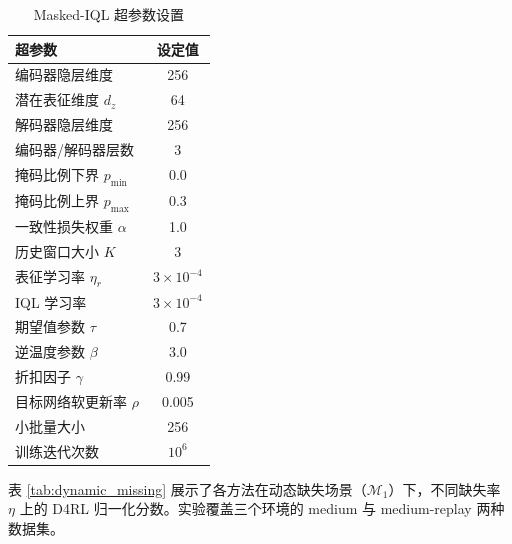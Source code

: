 \begin{table}[htbp]
    \centering
    \caption{Masked-IQL 超参数设置}
    \label{tab:masked_iql_hyperparams}
    \begin{tabular}{lc}
        \hline
        超参数 & 设定值 \\
        \hline
        编码器隐层维度 & 256 \\
        潜在表征维度 $d_z$ & 64 \\
        解码器隐层维度 & 256 \\
        编码器/解码器层数 & 3 \\
        掩码比例下界 $p_{\min}$ & 0.0 \\
        掩码比例上界 $p_{\max}$ & 0.3 \\
        一致性损失权重 $\alpha$ & 1.0 \\
        历史窗口大小 $K$ & 3 \\
        表征学习率 $\eta_r$ & $3 \times 10^{-4}$ \\
        IQL 学习率 & $3 \times 10^{-4}$ \\
        期望值参数 $\tau$ & 0.7 \\
        逆温度参数 $\beta$ & 3.0 \\
        折扣因子 $\gamma$ & 0.99 \\
        目标网络软更新率 $\rho$ & 0.005 \\
        小批量大小 & 256 \\
        训练迭代次数 & $10^6$ \\
        \hline
    \end{tabular}
\end{table}


表 \ref{tab:dynamic_missing} 展示了各方法在动态缺失场景（$\mathcal{M}_1$）下，不同缺失率 $\eta$ 上的 D4RL 归一化分数。实验覆盖三个环境的 medium 与 medium-replay 两种数据集。

